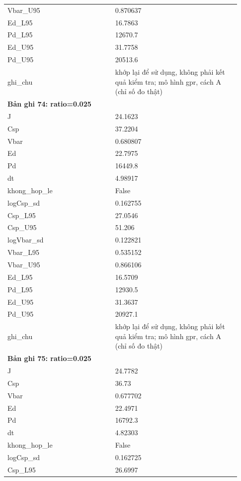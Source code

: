\begin{longtable}{p{0.43\linewidth}p{0.50\linewidth}}
Vbar\_\allowbreak U95 & 0.870637 \\
Ed\_\allowbreak L95 & 16.7863 \\
Pd\_\allowbreak L95 & 12670.7 \\
Ed\_\allowbreak U95 & 31.7758 \\
Pd\_\allowbreak U95 & 20513.6 \\
ghi\_\allowbreak chu & khớp lại để sử dụng, không phải kết quả kiểm tra; mô hình gpr, cách A (chỉ số đo thật) \\
\midrule
\multicolumn{2}{p{0.95\linewidth}}{\textbf{Bản ghi 74: ratio=0.025}} \\
J & 24.1623 \\
Csp & 37.2204 \\
Vbar & 0.680807 \\
Ed & 22.7975 \\
Pd & 16449.8 \\
dt & 4.98917 \\
khong\_\allowbreak hop\_\allowbreak le & False \\
logCsp\_\allowbreak sd & 0.162755 \\
Csp\_\allowbreak L95 & 27.0546 \\
Csp\_\allowbreak U95 & 51.206 \\
logVbar\_\allowbreak sd & 0.122821 \\
Vbar\_\allowbreak L95 & 0.535152 \\
Vbar\_\allowbreak U95 & 0.866106 \\
Ed\_\allowbreak L95 & 16.5709 \\
Pd\_\allowbreak L95 & 12930.5 \\
Ed\_\allowbreak U95 & 31.3637 \\
Pd\_\allowbreak U95 & 20927.1 \\
ghi\_\allowbreak chu & khớp lại để sử dụng, không phải kết quả kiểm tra; mô hình gpr, cách A (chỉ số đo thật) \\
\midrule
\multicolumn{2}{p{0.95\linewidth}}{\textbf{Bản ghi 75: ratio=0.025}} \\
J & 24.7782 \\
Csp & 36.73 \\
Vbar & 0.677702 \\
Ed & 22.4971 \\
Pd & 16792.3 \\
dt & 4.82303 \\
khong\_\allowbreak hop\_\allowbreak le & False \\
logCsp\_\allowbreak sd & 0.162725 \\
Csp\_\allowbreak L95 & 26.6997 \\

\end{longtable}
